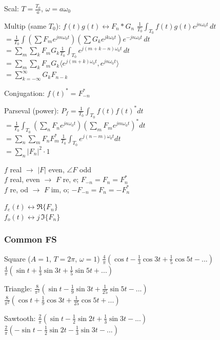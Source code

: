 \documentclass[4pt]{article}
\theoremstyle{definition}
\theoremstyle{definition}
\renewcommand{\o}{\omega}
\newcommand{\ra}{\rightarrow}
\newcommand{\lra}{\leftrightarrow}
\begin{document}
\begin{landscape}
\begin{multicols}{3}
    Scal: $T = \frac {T_0} a$, $\o = a\o_0$

    Multip (same $T_0$): $f(t) g(t) \lra F_n * G_n$ 
        $\frac 1{T_0}  \int_{T_0} f(t) g(t) e^{jn\o_0 t}\, dt$\\
        $ = \frac{1}{T_0} \int (\sum F_m e^{jm\o_0 t}) (\sum G_k e^{jk\o_0 t}) e^{-jn\o_0 t} \, dt$ \\
        $ = \sum_m \sum_k F_m G_k \frac{1}{T_0} \int_{T_0} e^{j(m+k-n)\o_0 t} \, dt$\\
        $ = \sum_m \sum_k F_m G_k \langle e^{j(m+k)\o_0 t}, e^{jn\o_0 t}\rangle$\\
        $ = \sum_{k=-\infty}^{\infty} G_k F_{n-k}$
        
    Conjugation: $f(t)^* = F^*_{-n}$

    Parseval (power): \(P_f = \frac 1{T_0}\int_{T_0} f(t) f(t)^* dt\)\\
    \(=\frac{1}{T_0}\int_{T_0} (\sum_n F_n e^{jn\o_0t})(\sum_m F_m e^{jm\o_0t})^* dt\)\\
    \(=\sum_n \sum_m  F_n F_m^* \, \frac{1}{T_0}\int_{T_0} e^{j(n-m)\o_0t} dt\)\\
    \(=\sum_n |F_n|^2 \cdot 1\)

        $f$ real $\ra$ $|F|$ even, $\angle F$ odd\\
        $f$ real, even $\ra$ $F$ re, e; $F_{-n} = F_n = F_n^*$\\
        $f$ re, od $\ra$ $F$ im, o; $-F_{-n} = F_n = -F_n^*$

        $f_e(t) \lra \Re\{ F_n\}$\\
        $f_o(t) \lra j \,\Im \{F_n\}$
\columnbreak
\subsubsection*{Common FS}
    Square ($A=1$, $T=2\pi$, $\omega = 1$) 
        $\frac{4}{\pi}(\cos t - \frac{1}{3}\cos 3t + \frac{1}{5} \cos 5t- ...)$\\
        $\frac{4}{\pi}(\sin t + \frac 1 3 \sin 3t + \frac 1 5 \sin 5t + ...)$

    Triangle: 
        $\frac{8}{\pi^2}(\sin t - \frac{1}{9} \sin 3t + \frac{1}{25} \sin 5t - ...)$\\
        $\frac{8}{\pi^2}(\cos t + \frac 1 9 \cos 3t + \frac 1 {25} \cos 5t + ...)$

    Sawtooth:   
        $\frac 2{\pi} (\sin t - \frac{1}{2} \sin 2t + \frac{1}{3} \sin 3t - ...)$\\
        $\frac 2{\pi} (-\sin t - \frac{1}{2} \sin 2t - \frac{1}{3} \sin 3t - ...)$


\end{multicols}
\end{landscape}
\end{document}
